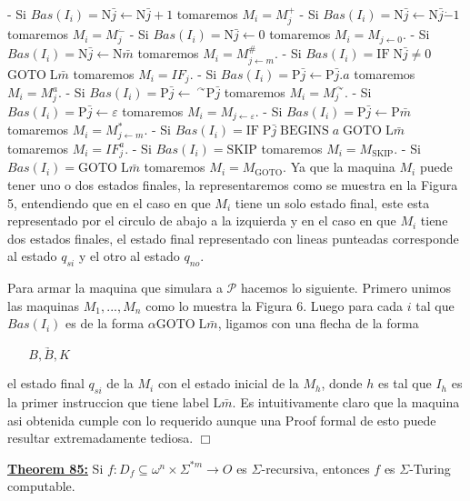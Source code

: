   - Si $Bas(I_{i})=\mathrm{N}\bar{j}\leftarrow \mathrm{N}\bar{j}+1$ tomaremos $M_{i}=M_{j}^{+}$
  - Si $Bas(I_{i})=\mathrm{N}\bar{j}\leftarrow \mathrm{N}\bar{j}\dot{-} 1 $ tomaremos $M_{i}=M_{j}^{\dot{-}}$
  - Si $Bas(I_{i})=\mathrm{N}\bar{j}\leftarrow 0$ tomaremos $ M_{i}=M_{j\leftarrow 0}$.
  - Si $Bas(I_{i})=\mathrm{N}\bar{j}\leftarrow \mathrm{N}\bar{m}$ tomaremos $M_{i}=M_{j\leftarrow m}^{\#}$.
  - Si $Bas(I_{i})=\mathrm{IF}\;\mathrm{N}\bar{j}\not=0$ $\mathrm{GOTO} \;\mathrm{L}\bar{m}$ tomaremos $M_{i}=IF_{j}.$
  - Si $Bas(I_{i})=\mathrm{P}\bar{j}\leftarrow \mathrm{P}\bar{j}.a$ tomaremos $M_{i}=M_{j}^{a}$.
  - Si $Bas(I_{i})=\mathrm{P}\bar{j}\leftarrow \ ^{\curvearrowright } \mathrm{P}\bar{j}$ tomaremos $M_{i}=M_{j}^{\curvearrowright }$.
  - Si $Bas(I_{i})=\mathrm{P}\bar{j}\leftarrow \varepsilon $ tomaremos $ M_{i}=M_{j\leftarrow \varepsilon }$.
  - Si $Bas(I_{i})=\mathrm{P}\bar{j}\leftarrow \mathrm{P}\bar{m}$ tomaremos $M_{i}=M_{j\leftarrow m}^{\ast }$.
  - Si $Bas(I_{i})=\mathrm{IF}\;\mathrm{P}\bar{j}\;\mathrm{BEGINS}\;a\; \mathrm{GOTO}\;\mathrm{L}\bar{m}$ tomaremos $M_{i}=IF_{j}^{a}$.
  - Si $Bas(I_{i})=\mathrm{SKIP}$ tomaremos $M_{i}=M_{\mathrm{SKIP}}$.
  - Si $Bas(I_{i})=\mathrm{GOTO}\;\mathrm{L}\bar{m}$ tomaremos $ M_{i}=M_{\mathrm{GOTO}}$.
  Ya que la maquina $M_{i}$ puede tener uno o dos estados finales, la representaremos como se muestra en la Figura 5, entendiendo que en el caso en que $M_{i}$ tiene un solo estado final, este esta representado por el circulo de abajo a la izquierda y en el caso en que $M_{i}$ tiene dos estados finales, el estado final representado con lineas punteadas corresponde al estado $q_{si}$ y el otro al estado $q_{no}$.

  Para armar la maquina que simulara a $\mathcal{P}$ hacemos lo siguiente. Primero unimos las maquinas $M_{1},...,M_{n}$ como lo muestra la Figura 6. Luego para cada $i$ tal que $Bas(I_{i})$ es de la forma $\alpha \mathrm{GOTO} \;\mathrm{L}\bar{m}$, ligamos con una flecha de la forma

  $\displaystyle \underrightarrow{\;\;\;\;\;\;B,B,K\;\;\;\;\;\;} $

  el estado final $q_{si}$ de la $M_{i}$ con el estado inicial de la $M_{h}$, donde $h$ es tal que $I_{h}$ es la primer instruccion que tiene label $ \mathrm{L}\bar{m}$.
  Es intuitivamente claro que la maquina asi obtenida cumple con lo requerido aunque una Proof formal de esto puede resultar extremadamente tediosa. $\Box$

  \textbf{\underline{Theorem 85:}} Si $f:D_{f}\subseteq \omega ^{n}\times \Sigma ^{\ast m}\rightarrow O$ es $ \Sigma $-recursiva, entonces $f$ es $\Sigma $-Turing computable.

